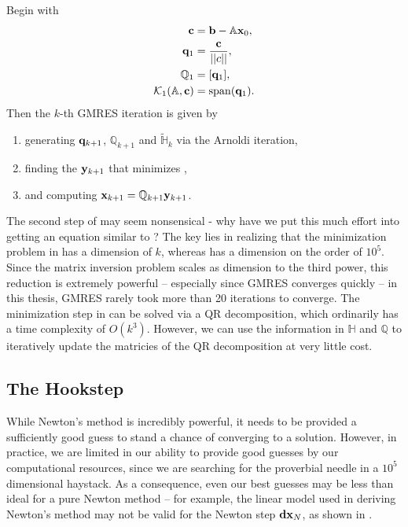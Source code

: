   \begin{algorithm}\label{alg:GMRES}
   Begin with
 \begin{align*}
 \mathbf{c} &= \mathbf{b} - \mathbb{A}\mathbf{x}_0,\\
  \mathbf{q}_1 &= \dfrac{\mathbf{c}}{||c||}, \\
  \mathbb{Q}_1 &= [\mathbf{q}_1],\\
  \mathcal{K}_1(\mathbb{A},\mathbf{c}) &= \mathrm{span}(\mathbf{q}_1).
  \end{align*}
  Then the $k$-th GMRES iteration is given by  
  \begin{enumerate}
  \item generating $\mathbf{q}_{k+1}$, $\mathbb{Q}_{k+1}$ and $\mathbb{\tilde{H}}_k$ via the Arnoldi iteration,
  \item finding the $\mathbf{y}_{k+1}$ that minimizes ,
  \item and computing $\mathbf{x}_{k+1} = \mathbb{Q}_{k+1}\mathbf{y}_{k+1}$.
  \end{enumerate}
  \end{algorithm}

 The second step of  may seem nonsensical - why have we put this much effort into getting an equation similar to ? The key lies in realizing that the minimization problem in   has a dimension of $k$, whereas  has a dimension on the order of $10^5$. Since the matrix inversion problem scales as dimension to the third power, this reduction is extremely powerful -- especially since GMRES converges quickly -- in this thesis, GMRES rarely took more than 20 iterations to converge. The minimization step in   can be solved via a QR decomposition, which ordinarily has a time complexity of $O(k^3)$. However, we can use the information in $\mathbb{H}$ and $\mathbb{Q}$ to iteratively update the matricies of the QR decomposition at very little cost.   
 
 \subsection{The Hookstep}
 
 While Newton's method is incredibly powerful, it needs to be provided a sufficiently good guess to stand a chance of converging to a solution. However, in practice, we are limited in our ability to provide good guesses by our computational resources, since we are searching for the proverbial needle in a $10^5$ dimensional haystack. As a consequence, even our best guesses may be less than ideal for a pure Newton method -- for example, the linear model used in deriving Newton's method may not be valid for the Newton step $\mathbf{dx}_N$, as shown in . 

